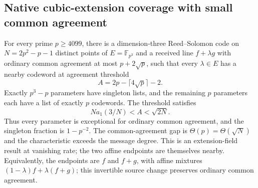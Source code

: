 \subsection{Native cubic-extension coverage with small common agreement}
\label{sec:fp3-common-agreement}

\begin{theorem}\label{thm:fp3-common-agreement}
For every prime $p\ge4099$, there is a dimension-three Reed--Solomon
code on $N=2p^2-p-1$ distinct points of $E=\mathbb F_{p^3}$ and a
received line $f+\lambda g$ with ordinary common agreement at most
$p+2\sqrt p$, such that every $\lambda\in E$ has a nearby codeword at
agreement threshold
\[
 A=2p-\lceil4\sqrt p\rceil-2.
\]
Exactly $p^3-p$ parameters have singleton lists, and the remaining
$p$ parameters each have a list of exactly $p$ codewords.
The threshold satisfies
\[
 N a_1(3/N)<A<\sqrt{2N}.
\]
Thus every parameter is exceptional for ordinary common agreement,
and the singleton fraction is $1-p^{-2}$. The common-agreement gap
is $\Theta(p)=\Theta(\sqrt N)$ and the characteristic exceeds the
message degree. This is an extension-field result at vanishing rate;
the two affine endpoints are themselves nearby.
Equivalently, the endpoints are $f$ and $f+g$, with affine mixtures
$(1-\lambda)f+\lambda(f+g)$; this invertible source change preserves
ordinary common agreement.
\end{theorem}


